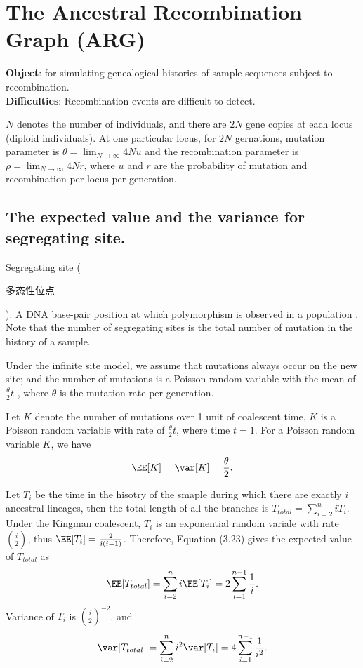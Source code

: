 


\chapter{The Ancestral Recombination Graph (ARG)}
{\bf Object}: for simulating genealogical histories of sample sequences subject to recombination. \\
{\bf Difficulties}: Recombination events are difficult to detect.

$N$ denotes the number of individuals, and there are $2N$ gene copies at each locus (diploid individuals). At one particular locus, for $2N$ gernations, mutation parameter is $\theta=\lim_{N\rightarrow\infty}4Nu$ and the recombination parameter is $\rho=\lim_{N\rightarrow\infty}4Nr$, where $u$ and $r$ are the probability of mutation and recombination per locus per generation.

\section{The expected value and the variance for segregating site.}
Segregating site (\begin{CJK*}{UTF8}{gbsn}多态性位点\end{CJK*}): A DNA base-pair position at which polymorphism is observed in a population \citep{Kimura1971}. Note that the number of segregating sites is the total number of mutation in the history of a sample.

Under the infinite site model, we assume that mutations always occur on the new site; and the number of mutations is a Poisson random variable with the mean of $\frac{\theta}{2}t$ \citep{Wakeley2008}, where $\theta$ is the mutation rate per generation.

Let $K$ denote the number of mutations over 1 unit of coalescent time, $K$ is a Poisson random variable with rate of $\frac{\theta}{2}t$, where time $t=1$. For a Poisson random variable $K$, we have
\begin{equation}
\EE[K]=\var[K]=\frac{\theta}{2}.\label{eq:mean_var_of_K}
\end{equation}

Let $T_i$ be the time in the hisotry of the smaple during which there are exactly $i$ ancestral lineages, then the total length of all the branches is $T_{total}=\sum^n_{i=2}iT_i$. Under the Kingman coalescent, $T_i$ is an exponential random variale with rate $\binom{i}{2}$, thus $\EE[T_i]=\frac{2}{i(i-1)}$. Therefore, \citet{Wakeley2008} Equation (3.23) gives the expected value of $T_{total}$ as 
\begin{equation}
\EE[T_{total}]=\sum^n_{i=2}i \EE[T_i]=2\sum^{n-1}_{i=1}\frac{1}{i}\label{Wakeley2008:eq:3.23}.
\end{equation}
Variance of $T_i$ is $\binom{i}{2}^{-2}$, and 
\begin{equation}
\var[T_{total}]=\sum^n_{i=2}i^2\var[T_i]=4\sum^{n-1}_{i=1}\frac{1}{i^2}.\label{Wakeley2008:eq:3.25}
\end{equation}

